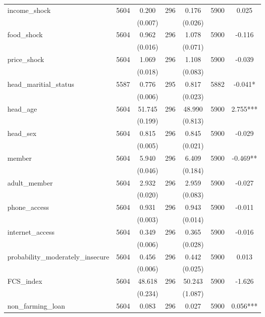 \begin{tabular}{@{\extracolsep{5pt}}lcccccc}
income\_shock   & 5604    & 0.200    & 296    & 0.176    & 5900    & 0.025   \\
 &   & (0.007)  &   & (0.026)  &   &  \\ [1ex]
food\_shock   & 5604    & 0.962    & 296    & 1.078    & 5900    & -0.116   \\
 &   & (0.016)  &   & (0.071)  &   &  \\ [1ex]
price\_shock   & 5604    & 1.069    & 296    & 1.108    & 5900    & -0.039   \\
 &   & (0.018)  &   & (0.083)  &   &  \\ [1ex]
head\_maritial\_status   & 5587    & 0.776    & 295    & 0.817    & 5882    & -0.041*   \\
 &   & (0.006)  &   & (0.023)  &   &  \\ [1ex]
head\_age   & 5604    & 51.745    & 296    & 48.990    & 5900    & 2.755***   \\
 &   & (0.199)  &   & (0.813)  &   &  \\ [1ex]
head\_sex   & 5604    & 0.815    & 296    & 0.845    & 5900    & -0.029   \\
 &   & (0.005)  &   & (0.021)  &   &  \\ [1ex]
member   & 5604    & 5.940    & 296    & 6.409    & 5900    & -0.469**   \\
 &   & (0.046)  &   & (0.184)  &   &  \\ [1ex]
adult\_member   & 5604    & 2.932    & 296    & 2.959    & 5900    & -0.027   \\
 &   & (0.020)  &   & (0.083)  &   &  \\ [1ex]
phone\_access   & 5604    & 0.931    & 296    & 0.943    & 5900    & -0.011   \\
 &   & (0.003)  &   & (0.014)  &   &  \\ [1ex]
internet\_access   & 5604    & 0.349    & 296    & 0.365    & 5900    & -0.016   \\
 &   & (0.006)  &   & (0.028)  &   &  \\ [1ex]
probability\_moderately\_insecure   & 5604    & 0.456    & 296    & 0.442    & 5900    & 0.013   \\
 &   & (0.006)  &   & (0.025)  &   &  \\ [1ex]
FCS\_index   & 5604    & 48.618    & 296    & 50.243    & 5900    & -1.626   \\
 &   & (0.234)  &   & (1.087)  &   &  \\ [1ex]
non\_farming\_loan   & 5604    & 0.083    & 296    & 0.027    & 5900    & 0.056***   \\

\end{tabular}
